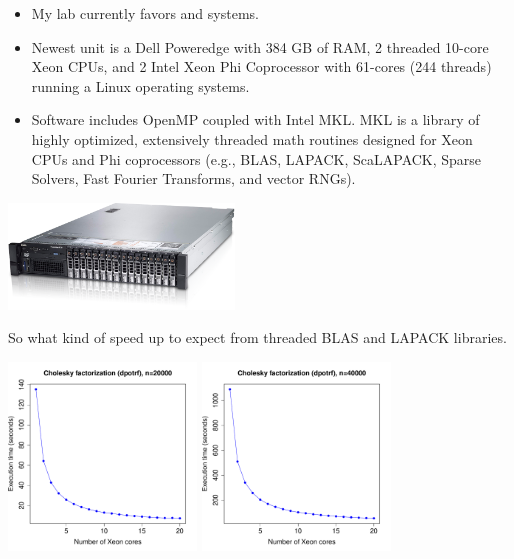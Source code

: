 \begin{frame}
\begin{itemize}\setlength{\itemsep}{0.2cm}
\item My lab currently favors  and  systems.

\item Newest unit is a Dell Poweredge with 384 GB of RAM, 2 threaded 10-core Xeon CPUs, and 2 Intel Xeon Phi Coprocessor with 61-cores (244 threads) running a Linux operating systems.

\item Software includes OpenMP coupled with Intel MKL. MKL is a library of highly optimized, extensively threaded math routines designed for Xeon CPUs and Phi coprocessors (e.g., BLAS, LAPACK, ScaLAPACK, Sparse Solvers, Fast Fourier Transforms, and vector RNGs).
\end{itemize}
\begin{center}
\includegraphics[width=6cm]{../figures/poweredge.png}
\end{center}
\end{frame}

\begin{frame}
So what kind of speed up to expect from threaded BLAS and LAPACK libraries.
\begin{center}
\includegraphics[width=5cm]{../figures/n20k-xeon.pdf}
\includegraphics[width=5cm]{../figures/n40k-xeon.pdf}
\end{center}
\end{frame}

